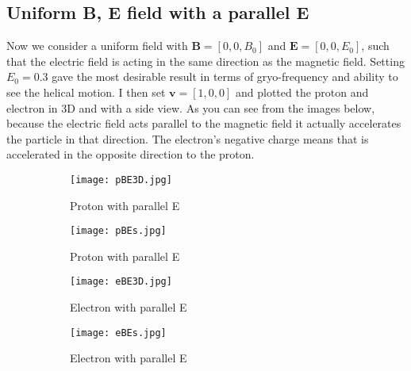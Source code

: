 \documentclass[14paper,11pt,hidelinks]{article}
\begin{document}
\subsection{Uniform B, E field with a parallel E}
Now we consider a uniform field with \begin{math} \mathbf{B}=[0,0,B_0] \end{math} and \begin{math} \mathbf{E}=[0,0,E_0] \end{math}, such that the electric field is acting in the same direction as the magnetic field. Setting \begin{math} E_0=0.3 \end{math} gave the most desirable result in terms of gryo-frequency and ability to see the helical motion. I then set \begin{math} \mathbf{v}=[1,0,0] \end{math} and plotted the proton and electron in 3D and with a side view. As you can see from the images below, because the electric field acts parallel to the magnetic field it actually accelerates the particle in that direction. The electron's negative charge means that is accelerated in the opposite direction to the proton. 
\newline
\begin{figure}[h!]
\centering
\begin{subfigure}[b]{0.3\linewidth}
\texttt{[image: pBE3D.jpg]} 
\caption*{Proton with parallel E}
\end{subfigure}
\begin{subfigure}[b]{0.3\linewidth}
\texttt{[image: pBEs.jpg]}
\caption*{Proton with parallel E}
\end{subfigure}
\caption{}
\end{figure}
\begin{figure}[h!]
\centering
\begin{subfigure}[b]{0.3\linewidth}
\texttt{[image: eBE3D.jpg]} 
\caption*{Electron with parallel E}
\end{subfigure}
\begin{subfigure}[b]{0.3\linewidth}
\texttt{[image: eBEs.jpg]}
\caption*{Electron with parallel E}
\end{subfigure}
\caption{}
\end{figure}
\newline


\end{document}
